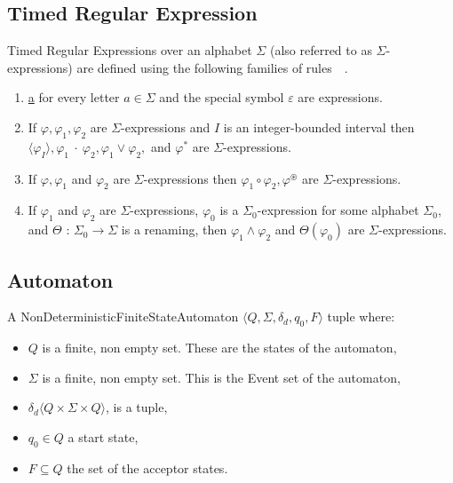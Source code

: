 		\subsection{Timed Regular Expression}
			\begin{dfn}
				Timed Regular Expressions over an alphabet $\Sigma$ (also referred to as $\Sigma$-expressions)
				are defined using the following families of rules~\citep{tre}~.
				\begin{enumerate}
					\item \underline{a} for every letter $a \in \Sigma$ and the special symbol $\varepsilon$ are expressions.
					\item If $\varphi, \varphi_1, \varphi_2$ are $\Sigma$-expressions and $I$ is an integer-bounded interval then
						$\langle\varphi_I\rangle, \varphi_1~\cdot~\varphi_2, \varphi_1 \vee \varphi_2,$ and $\varphi^\ast$ are $\Sigma$-expressions.
					\item If $\varphi, \varphi_1$ and $\varphi_2$ are $\Sigma$-expressions then $\varphi_1 \circ \varphi_2, \varphi^\circledast$ are
						$\Sigma$-expressions.
					\item If $\varphi_1$ and $\varphi_2$ are $\Sigma$-expressions, $\varphi_0$ is a $\Sigma_0$-expression
						for some alphabet $\Sigma_0$, and $\Theta$ : $\Sigma_0 \rightarrow \Sigma$ is
						a renaming, then $\varphi_1 \wedge \varphi_2$ and $\Theta(\varphi_0)$ are $\Sigma$-expressions.
				\end{enumerate}
			\end{dfn}
			
		\subsection{Automaton}
			\begin{dfn}
				\label{dfn:cep:nfsm}
				A NonDeterministicFiniteStateAutomaton $\langle Q,\Sigma,\delta_d,q_0, F \rangle$ tuple where:
					\begin{itemize}
						\item $Q$ is a finite, non empty set. These are the states of the automaton,
						\item $\Sigma$ is a finite, non empty set. This is the Event set of the automaton,
						\item $\delta_d \langle Q \times \Sigma \times Q \rangle$, is a tuple,
						\item $q_0 \in Q$ a start state,
						\item $F \subseteq Q$ the set of the acceptor states.
					\end{itemize}
				
			\end{dfn}
			
